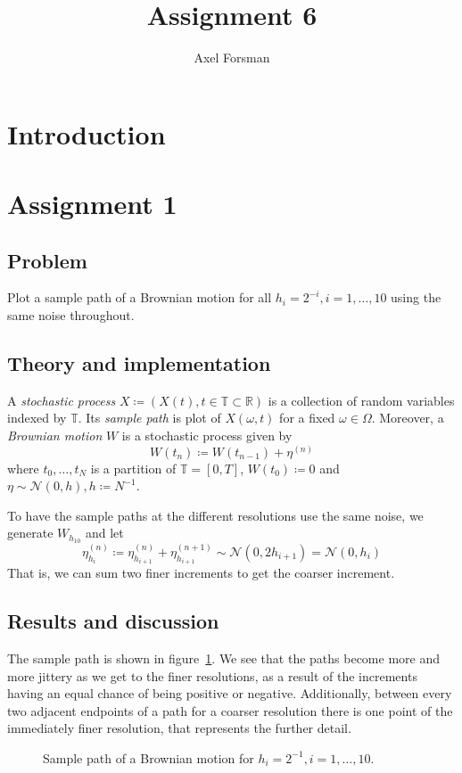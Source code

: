 \documentclass[11pt, a4paper]{article}
\title{Assignment 6}
\author{Axel Forsman}
\begin{document}
\maketitle

\section{Introduction}

\section{Assignment 1}
\subsection{Problem}
Plot a sample path of a Brownian motion for all $h_i = 2^{-i}, i = 1, \ldots, 10$
using the same noise throughout.
\subsection{Theory and implementation}
A \emph{stochastic process} $X \coloneqq (X(t), t \in \mathbb T \subset \mathbb R)$
is a collection of random variables indexed by $\mathbb T$.
Its \emph{sample path} is plot of $X(\omega, t)$ for a fixed $\omega \in \Omega$.
Moreover,
a \emph{Brownian motion} $W$ is a stochastic process given by
$$ W(t_n) \coloneqq W(t_{n-1}) + \eta^{(n)} $$
where $t_0, \ldots, t_N$ is a partition of $\mathbb T = [0, T]$,
$W(t_0) \coloneqq 0$ and $\eta \sim \mathcal N(0, h), h \coloneqq N^{-1}$.

To have the sample paths at the different resolutions use the same noise,
we generate $W_{h_{10}}$ and let
$$ \eta_{h_i}^{(n)} \coloneqq \eta_{h_{i+1}}^{(n)} + \eta_{h_{i+1}}^{(n+1)} \sim \mathcal N(0, 2h_{i+1})
	= \mathcal N(0, h_i) $$
That is, we can sum two finer increments to get the coarser increment.
\subsection{Results and discussion}
The sample path is shown in figure~\ref{fig:brownian_motion}.
We see that the paths become more and more jittery as we get to the finer resolutions,
as a result of the increments having an equal chance of being positive or negative.
Additionally, between every two adjacent endpoints of a path for a coarser resolution
there is one point of the immediately finer resolution,
that represents the further detail.

\begin{figure}
	\centering
	
	\caption{Sample path of a Brownian motion for $h_i = 2^{-1}, i = 1, \ldots, 10$. \label{fig:brownian_motion}}
\end{figure}
\end{document}
